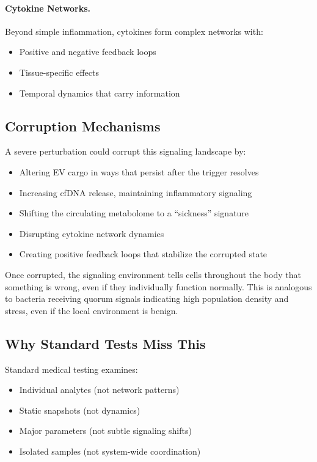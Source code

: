 \paragraph{Cytokine Networks.} Beyond simple inflammation, cytokines form complex networks with:
\begin{itemize}
    \item Positive and negative feedback loops
    \item Tissue-specific effects
    \item Temporal dynamics that carry information
\end{itemize}

\subsection{Corruption Mechanisms}

A severe perturbation could corrupt this signaling landscape by:

\begin{itemize}
    \item Altering EV cargo in ways that persist after the trigger resolves
    \item Increasing cfDNA release, maintaining inflammatory signaling
    \item Shifting the circulating metabolome to a ``sickness'' signature
    \item Disrupting cytokine network dynamics
    \item Creating positive feedback loops that stabilize the corrupted state
\end{itemize}

Once corrupted, the signaling environment tells cells throughout the body that something is wrong, even if they individually function normally. This is analogous to bacteria receiving quorum signals indicating high population density and stress, even if the local environment is benign.

\subsection{Why Standard Tests Miss This}

Standard medical testing examines:
\begin{itemize}
    \item Individual analytes (not network patterns)
    \item Static snapshots (not dynamics)
    \item Major parameters (not subtle signaling shifts)
    \item Isolated samples (not system-wide coordination)
\end{itemize}

